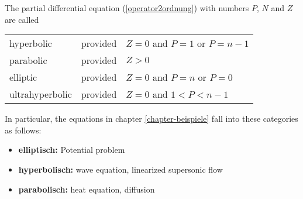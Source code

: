 \begin{definition} The partial differential equation
(\ref{operator2ordnung})
with numbers $P$, $N$ and $Z$ are called
\begin{center}
\begin{tabular}{lcl}
hyperbolic&provided&$Z=0$ and $P=1$ or $P=n-1$\\
parabolic&provided&$Z>0$\\
elliptic&provided&$Z=0$ and $P=n$ or $P=0$\\
ultrahyperbolic&provided&$Z=0$ and $1<P<n-1$
\end{tabular}
\end{center}
\end{definition}
In particular, the equations in chapter \ref{chapter-beispiele}
fall into these categories as follows:
\begin{itemize}
\item {\bf elliptisch:} Potential problem
\item {\bf hyperbolisch:} wave equation, linearized supersonic flow
\item {\bf parabolisch:} heat equation, diffusion
\end{itemize}

